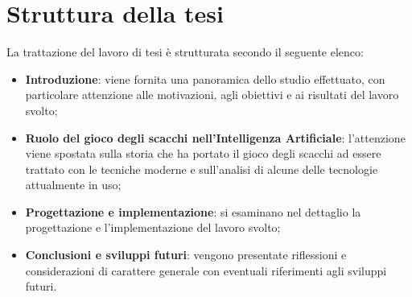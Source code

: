 \section{Struttura della tesi}
La trattazione del lavoro di tesi è strutturata secondo il seguente elenco:
\begin{itemize}
    \item \textbf{Introduzione}: viene fornita una panoramica dello studio effettuato, con particolare attenzione alle motivazioni, 
    agli obiettivi e ai risultati del lavoro svolto;
    \item \textbf{Ruolo del gioco degli scacchi nell'Intelligenza Artificiale}: l'attenzione viene spostata sulla storia che ha portato il gioco degli scacchi ad essere trattato con le tecniche moderne e sull'analisi di alcune delle tecnologie attualmente in uso;
    \item \textbf{Progettazione e implementazione}: si esaminano nel dettaglio la progettazione e l'implementazione del lavoro svolto;
    \item \textbf{Conclusioni e sviluppi futuri}: vengono presentate riflessioni e considerazioni di carattere generale con eventuali riferimenti agli sviluppi futuri.
\end{itemize}

